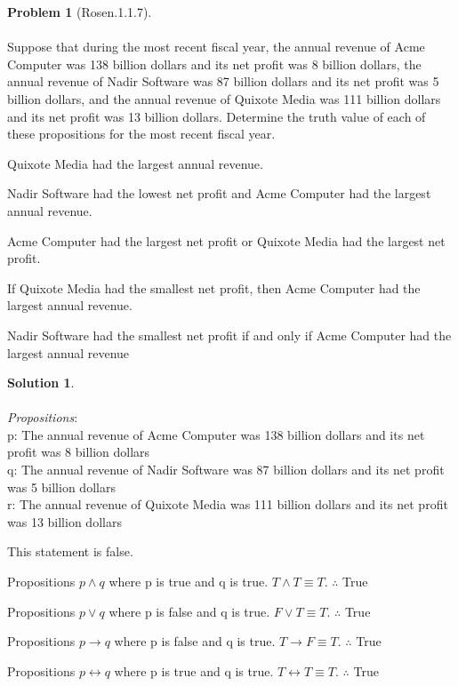 \documentclass{article}
\theoremstyle{definition}
\newtheorem*{problem}{Problem}
\newtheorem*{solution}{Solution}
\begin{document}
\begin{problem}[Rosen.1.1.7]\ \\
\ \\
Suppose that during the most recent fiscal year, the annual
revenue of Acme Computer was 138 billion dollars
and its net profit was 8 billion dollars, the annual revenue
of Nadir Software was 87 billion dollars and its net profit
was 5 billion dollars, and the annual revenue of Quixote
Media was 111 billion dollars and its net profit was
13 billion dollars. Determine the truth value of each of
these propositions for the most recent fiscal year.
\ \\
\begin{compactenum}
\renewcommand{\theenumi}{\alph{enumi}}
\item Quixote Media had the largest annual revenue.
\item Nadir Software had the lowest net profit and Acme
Computer had the largest annual revenue.
\item Acme Computer had the largest net profit or Quixote
Media had the largest net profit.
\item If Quixote Media had the smallest net profit, then
Acme Computer had the largest annual revenue.
\item Nadir Software had the smallest net profit if and only
if Acme Computer had the largest annual revenue

\end{compactenum}
\end{problem}

\begin{solution}\ \\
\ \\
\noindent 
\textit{Propositions}:\ \\
p: The annual revenue of Acme Computer was 138 billion dollars and its net profit was 8 billion dollars\ \\
q: The annual revenue of Nadir Software was 87 billion dollars and its net profit
was 5 billion dollars\ \\
r: The annual revenue of Quixote Media was 111 billion dollars and its net profit was
13 billion dollars\ \\
\begin{compactenum}
\renewcommand{\theenumi}{\alph{enumi}}
\item This statement is false.
\item Propositions $p \wedge q$ where p is true and q is true. $T \wedge T \equiv T$. $\therefore$ True
\item Propositions $p \vee q$ where p is false and q is true. $F \vee T \equiv T$. $\therefore$ True
\item Propositions $p \xrightarrow{} q$ where p is false and q is true. $T \xrightarrow{} F \equiv T$. $\therefore$ True
\item Propositions $p \leftrightarrow q$ where p is true and q is true. $T \leftrightarrow T \equiv T$. $\therefore$ True
\end{compactenum}
\end{solution}
\end{document}
